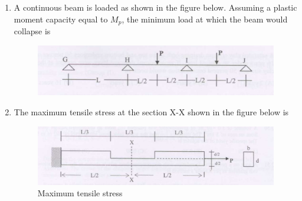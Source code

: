 \documentclass[journal]{IEEEtran}
\begin{document}
\begin{enumerate}
\begin{enumerate}
\end{enumerate}

\item A continuous beam is loaded as shown in the figure below. Assuming a plastic moment capacity equal to $M_p$, the minimum load at which the beam would collapse is \hfill {}

\begin{figure}[H]
    \centering
    \includegraphics[width=0.6\columnwidth]{figs/fig1.png} 
    \caption{}
    \label{fig:placeholder}
\end{figure} 

\begin{enumerate}
\end{enumerate}

\item The maximum tensile stress at the section X-X shown in the figure below is \hfill {}

\begin{figure}[H]
    \centering
    \includegraphics[width=0.6\columnwidth]{figs/fig2.png} 
    \caption{Maximum tensile stress}
    \label{fig:placeholder}
\end{figure}
\begin{enumerate}
\end{enumerate}
\end{enumerate}
\end{document}
